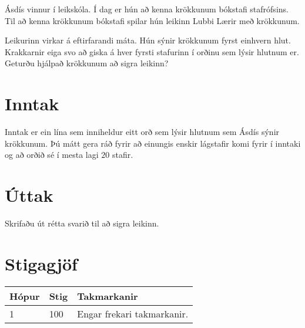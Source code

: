 
Ásdís vinnur í leikskóla.
Í dag er hún að kenna krökkunum bókstafi stafrófsins.
Til að kenna krökkunum bókstafi spilar hún leikinn Lubbi Lærir með krökkunum.

Leikurinn virkar á eftirfarandi máta.
Hún sýnir krökkunum fyrst einhvern hlut.
Krakkarnir eiga svo að giska á hver fyrsti stafurinn í orðinu sem lýsir hlutnum er.
Geturðu hjálpað krökkunum að sigra leikinn?

\section*{Inntak}
Inntak er ein lína sem inniheldur eitt orð sem lýsir hlutnum sem Ásdís sýnir krökkunum.
Þú mátt gera ráð fyrir að einungis enskir lágstafir komi fyrir í inntaki og að orðið sé í mesta lagi $20$ stafir.

\section*{Úttak}
Skrifaðu út rétta svarið til að sigra leikinn.

\section*{Stigagjöf}
\begin{tabular}{|l|l|l|}
\hline
Hópur & Stig & Takmarkanir \\ \hline
1     & 100   & Engar frekari takmarkanir. \\ \hline
\end{tabular}
